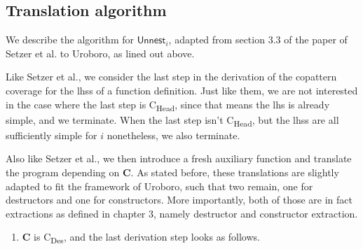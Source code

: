 \subsection{Translation algorithm}
\label{ssec:unntransl}

We describe the algorithm for $\textsf{Unnest}_i$, adapted from section 3.3 of the paper of Setzer et al. to Uroboro, as lined out above.

\begin{algorithm}

Like Setzer et al., we consider the last step in the derivation of the copattern coverage for the lhss of a function definition. Just like them, we are not interested in the case where the last step is C\textsubscript{Head}, since that means the lhs is already simple, and we terminate. When the last step isn't C\textsubscript{Head}, but the lhss are all sufficiently simple for $i$ nonetheless, we also terminate.

\begin{prooftree}
\end{prooftree}

Also like Setzer et al., we then introduce a fresh auxiliary function and translate the program depending on \textbf{C}. As stated before, these translations are slightly adapted to fit the framework of Uroboro, such that two remain, one for destructors and one for constructors. More importantly, both of those are in fact extractions as defined in chapter 3, namely destructor and constructor extraction. 

\begin{enumerate}
\item \textbf{C} is C\textsubscript{Des}, and the last derivation step looks as follows.

\begin{prooftree}
\end{prooftree}


\end{enumerate}
\end{algorithm}

